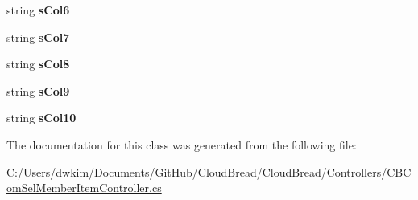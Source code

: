 \begin{DoxyCompactItemize}
\item 
string {\bfseries s\+Col6}\hypertarget{class_cloud_bread_1_1_controllers_1_1_c_b_com_sel_member_item_controller_1_1_model_adef78c6983cb7fb97802247a395b6540}{}\label{class_cloud_bread_1_1_controllers_1_1_c_b_com_sel_member_item_controller_1_1_model_adef78c6983cb7fb97802247a395b6540}

\item 
string {\bfseries s\+Col7}\hypertarget{class_cloud_bread_1_1_controllers_1_1_c_b_com_sel_member_item_controller_1_1_model_a44d7018f2a722263a433c98959eefc92}{}\label{class_cloud_bread_1_1_controllers_1_1_c_b_com_sel_member_item_controller_1_1_model_a44d7018f2a722263a433c98959eefc92}

\item 
string {\bfseries s\+Col8}\hypertarget{class_cloud_bread_1_1_controllers_1_1_c_b_com_sel_member_item_controller_1_1_model_a95f5aa7e5dc0110789958bf2da630f72}{}\label{class_cloud_bread_1_1_controllers_1_1_c_b_com_sel_member_item_controller_1_1_model_a95f5aa7e5dc0110789958bf2da630f72}

\item 
string {\bfseries s\+Col9}\hypertarget{class_cloud_bread_1_1_controllers_1_1_c_b_com_sel_member_item_controller_1_1_model_aa4ed4bd166e02917dc3b6a5a6b1b22ab}{}\label{class_cloud_bread_1_1_controllers_1_1_c_b_com_sel_member_item_controller_1_1_model_aa4ed4bd166e02917dc3b6a5a6b1b22ab}

\item 
string {\bfseries s\+Col10}\hypertarget{class_cloud_bread_1_1_controllers_1_1_c_b_com_sel_member_item_controller_1_1_model_a576834912d5ed1cd0fba71a458354305}{}\label{class_cloud_bread_1_1_controllers_1_1_c_b_com_sel_member_item_controller_1_1_model_a576834912d5ed1cd0fba71a458354305}

\end{DoxyCompactItemize}


The documentation for this class was generated from the following file\+:\begin{DoxyCompactItemize}
\item 
C\+:/\+Users/dwkim/\+Documents/\+Git\+Hub/\+Cloud\+Bread/\+Cloud\+Bread/\+Controllers/\hyperlink{_c_b_com_sel_member_item_controller_8cs}{C\+B\+Com\+Sel\+Member\+Item\+Controller.\+cs}\end{DoxyCompactItemize}
